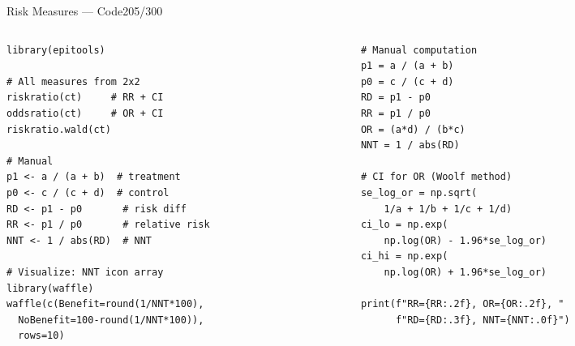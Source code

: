 \documentclass[10pt]{beamer}
\newcommand{\smark}[1]{\hfill{\scriptsize\color{codegray}#1}}
\begin{document}
\begin{frame}[fragile]{Risk Measures --- Code}\smark{205/300}
\begin{columns}[T]
\begin{column}{0.48\textwidth}
\begin{lstlisting}[style=Rstyle]
library(epitools)

# All measures from 2x2
riskratio(ct)     # RR + CI
oddsratio(ct)     # OR + CI
riskratio.wald(ct)

# Manual
p1 <- a / (a + b)  # treatment
p0 <- c / (c + d)  # control
RD <- p1 - p0       # risk diff
RR <- p1 / p0       # relative risk
NNT <- 1 / abs(RD)  # NNT

# Visualize: NNT icon array
library(waffle)
waffle(c(Benefit=round(1/NNT*100),
  NoBenefit=100-round(1/NNT*100)),
  rows=10)
\end{lstlisting}
\end{column}
\begin{column}{0.48\textwidth}
\begin{lstlisting}[style=Pystyle]
# Manual computation
p1 = a / (a + b)
p0 = c / (c + d)
RD = p1 - p0
RR = p1 / p0
OR = (a*d) / (b*c)
NNT = 1 / abs(RD)

# CI for OR (Woolf method)
se_log_or = np.sqrt(
    1/a + 1/b + 1/c + 1/d)
ci_lo = np.exp(
    np.log(OR) - 1.96*se_log_or)
ci_hi = np.exp(
    np.log(OR) + 1.96*se_log_or)

print(f"RR={RR:.2f}, OR={OR:.2f}, "
      f"RD={RD:.3f}, NNT={NNT:.0f}")
\end{lstlisting}
\end{column}
\end{columns}
\end{frame}
\end{document}

